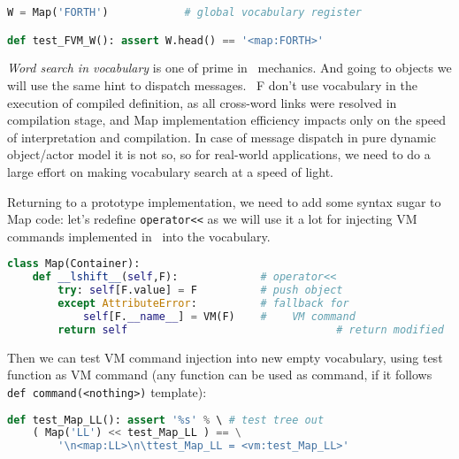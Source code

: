 \clearpage{}\label{vocab}

\begin{lstlisting}[language=Python]
W = Map('FORTH')			# global vocabulary register

def test_FVM_W(): assert W.head() == '<map:FORTH>'
\end{lstlisting}

\emph{Word search in vocabulary} is one of prime in \F\ mechanics. And going to
objects we will use the same hint to dispatch messages. \F\ F don't use
vocabulary in the execution of compiled definition, as all cross-word links were
resolved in compilation stage, and Map implementation efficiency impacts only on
the speed of interpretation and compilation. In case of message dispatch in pure
dynamic object/actor model it is not so, so for real-world applications, we need
to do a large effort on making vocabulary search at a speed of light.

\bigskip
Returning to a prototype implementation, we need to add some syntax sugar to Map
code: let's redefine \verb|operator<<| as we will use it a lot for injecting VM
commands implemented in \py\ into the vocabulary.

\begin{lstlisting}[language=Python]
class Map(Container):
	def __lshift__(self,F):				# operator<<
		try: self[F.value] = F			# push object
		except AttributeError:			# fallback for 
			self[F.__name__] = VM(F)	#    VM command
		return self									# return modified
\end{lstlisting}
\clearpage\noindent
Then we can test VM command injection into new empty vocabulary, using test
function as VM command (any function can be used as command, if it follows  
\verb|def command(<nothing>)| template):
\begin{lstlisting}[language=Python]
def test_Map_LL(): assert '%s' % \ # test tree out
	( Map('LL') << test_Map_LL ) == \
		'\n<map:LL>\n\ttest_Map_LL = <vm:test_Map_LL>'
\end{lstlisting}
